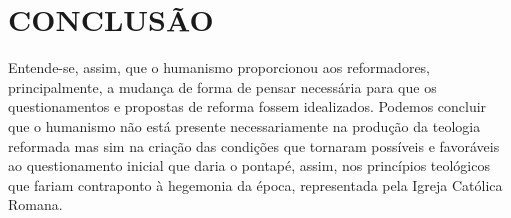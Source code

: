\documentclass[
    article,            %
	12pt,				%
	oneside,			%
	a4paper,			%
	english,			%
	french,				%
	spanish,			%
	brazil				%
	]{abntex2}
\begin{document}
\section{CONCLUSÃO}
Entende-se, assim, que o humanismo proporcionou aos reformadores, principalmente, a mudança de forma de pensar necessária para que os questionamentos e propostas de reforma fossem idealizados. Podemos concluir que o humanismo não está presente necessariamente na produção da teologia reformada mas sim na criação das condições que tornaram possíveis e favoráveis ao questionamento inicial que daria o pontapé, assim, nos princípios teológicos que fariam contraponto à hegemonia da época, representada pela Igreja Católica Romana.

\pagebreak

\end{document}
